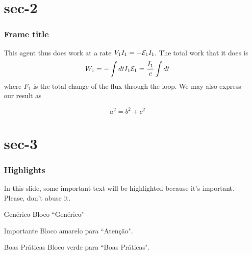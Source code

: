 \documentclass{beamer}
\begin{document}
\section{sec-2}

\begin{frame}
\frametitle{Frame title}

This agent thus does work at a rate $V_1I_1=-{\cal E}_1I_1$. The total work 
    that it does is
    \begin{equation}
        W_1=-\int dtI_1{\cal E}_1=\frac{I_1}{c}\int dt
    \end{equation}
    where $F_1$ is the total change of the flux through the loop. We may 
    also express our result as

\begin{equation}
    a^{2}= b^{2}+c^{2}
\end{equation}

\end{frame}

\section{sec-3}

\begin{frame}
    \frametitle{Highlights}
    
    In this slide, some important text will be
    \alert{highlighted} because it's important.
    Please, don't abuse it.
    
    \begin{block}{Genérico}
    Bloco ``Genérico"
    \end{block}
    
    \begin{alertblock}{Importante}
    Bloco amarelo para ``Atenção".
    \end{alertblock}
    
    \begin{examples}{Boas Práticas}
    Bloco verde para ``Boas Práticas".
    \end{examples}

\end{frame}

\frame{\printbibliography}
\end{document}

